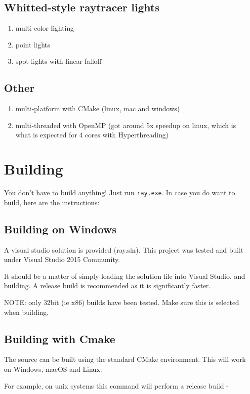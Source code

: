 \subsection{Whitted-style raytracer lights}
    \begin{enumerate}
    \item multi-color lighting
    \item point lights
    \item spot lights with linear falloff
    \end{enumerate}

\subsection{Other}
    \begin{enumerate}
    \item multi-platform with CMake (linux, mac and windows)
    \item multi-threaded with OpenMP (got around 5x speedup on linux, which is what is expected for 4 cores with Hyperthreading)
    \end{enumerate}

\section{Building}
You don't have to build anything! 
Just run \verb:ray.exe:.
In case you do want to build, here are the instructions:

\subsection{Building on Windows}
A visual studio solution is provided (ray.sln). This project was tested and built under Visual Studio 2015 Community. 

It should be a matter of simply loading the solution file into Visual Studio, and building. A release build is recommended as it is significantly faster.

NOTE: only 32bit (ie x86) builds have been tested. Make sure this is selected when building.

\subsection{Building with Cmake}
The source can be built using the standard CMake environment. This will work on Windows, macOS and Linux. 

For example, on unix systems this command will perform a release build -

